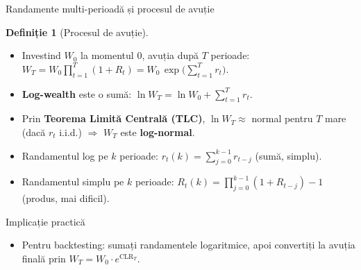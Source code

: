 \documentclass[9pt, aspectratio=169, t]{beamer}
\theoremstyle{definition}
\newtheorem{defn}{Definiție}
\begin{document}
\begin{frame}{Randamente multi-perioadă și procesul de avuție}
\begin{defn}[Procesul de avuție]
\begin{itemize}\setlength{\itemsep}{1pt}
    \item Investind $W_0$ la momentul 0, avuția după $T$ perioade:
    $W_T = W_0 \prod_{t=1}^{T}(1 + R_t) = W_0\, \exp\!\bigl(\sum_{t=1}^T r_t\bigr).$
\end{itemize}
\end{defn}
\begin{itemize}\small\setlength{\itemsep}{1pt}
    \item \textbf{Log-wealth} este o sumă: $\ln W_T = \ln W_0 + \sum_{t=1}^T r_t$.
    \item Prin \textbf{Teorema Limită Centrală (TLC)}, $\ln W_T \approx$ normal pentru $T$ mare (dacă $r_t$ i.i.d.) $\Rightarrow$ $W_T$ este \textbf{log-normal}.
    \item Randamentul log pe $k$ perioade: $r_t(k) = \sum_{j=0}^{k-1} r_{t-j}$ (sumă, simplu).
    \item Randamentul simplu pe $k$ perioade: $R_t(k) = \prod_{j=0}^{k-1}(1+R_{t-j}) - 1$ (produs, mai dificil).
\end{itemize}
\begin{block}{Implicație practică}
\begin{itemize}
\item Pentru backtesting: sumați randamentele logaritmice, apoi convertiți la avuția finală prin $W_T = W_0 \cdot e^{\text{CLR}_T}$.
\end{itemize}
\end{block}
\end{frame}
\end{document}
